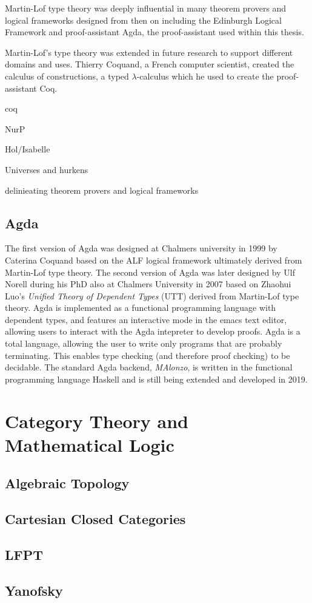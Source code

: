 Martin-Lof type theory was deeply influential in many theorem provers and
logical frameworks designed from then on including the Edinburgh Logical
Framework and proof-assistant Agda, the proof-assistant used within this thesis.

Martin-Lof's type theory was extended in future research to support different
domains and uses. Thierry Coquand, a French computer scientist, created the
calculus of constructions, a typed $\lambda$-calculus which he used to create
the proof-assistant Coq.

coq

NurP

Hol/Isabelle

Universes and hurkens

delinieating theorem provers and logical frameworks

\subsection{Agda}
The first version of Agda was designed at Chalmers university in 1999 by
Caterina Coquand based on the ALF logical framework ultimately derived from
Martin-Lof type theory. The second version of Agda was later designed by Ulf
Norell during his PhD also at Chalmers University in 2007 based on Zhaohui Luo's
\textit{Unified Theory of Dependent Types} (UTT) derived from Martin-Lof type
theory. Agda is implemented as a functional programming language with dependent
types, and features an interactive mode in the emacs text editor, allowing users
to interact with the Agda intepreter to develop proofs. Agda is a total
language, allowing the user to write only programs that are probably
terminating. This enables type checking (and therefore proof checking) to be
decidable. The standard Agda backend, \textit{MAlonzo}, is written in the
functional programming language Haskell and is still being extended and
developed in 2019.
\section{Category Theory and Mathematical Logic}
\subsection{Algebraic Topology}
\subsection{Cartesian Closed Categories}
\subsection{LFPT}
\subsection{Yanofsky}

